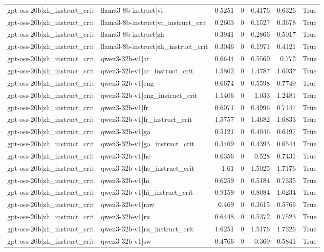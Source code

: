 \begin{table}
\begin{tabular}{l l r r r r l}
gpt-oss-20b|zh_instruct_crit & llama3-8b-instruct|vi & 0.5251 & 0 & 0.4176 & 0.6326 & True \\
gpt-oss-20b|zh_instruct_crit & llama3-8b-instruct|vi_instruct_crit & 0.2603 & 0 & 0.1527 & 0.3678 & True \\
gpt-oss-20b|zh_instruct_crit & llama3-8b-instruct|zh & 0.3941 & 0 & 0.2866 & 0.5017 & True \\
gpt-oss-20b|zh_instruct_crit & llama3-8b-instruct|zh_instruct_crit & 0.3046 & 0 & 0.1971 & 0.4121 & True \\
gpt-oss-20b|zh_instruct_crit & qwen3-32b-v1|ar & 0.6644 & 0 & 0.5569 & 0.772 & True \\
gpt-oss-20b|zh_instruct_crit & qwen3-32b-v1|ar_instruct_crit & 1.5862 & 0 & 1.4787 & 1.6937 & True \\
gpt-oss-20b|zh_instruct_crit & qwen3-32b-v1|eng & 0.6674 & 0 & 0.5598 & 0.7749 & True \\
gpt-oss-20b|zh_instruct_crit & qwen3-32b-v1|eng_instruct_crit & 1.1406 & 0 & 1.033 & 1.2481 & True \\
gpt-oss-20b|zh_instruct_crit & qwen3-32b-v1|fr & 0.6071 & 0 & 0.4996 & 0.7147 & True \\
gpt-oss-20b|zh_instruct_crit & qwen3-32b-v1|fr_instruct_crit & 1.5757 & 0 & 1.4682 & 1.6833 & True \\
gpt-oss-20b|zh_instruct_crit & qwen3-32b-v1|ga & 0.5121 & 0 & 0.4046 & 0.6197 & True \\
gpt-oss-20b|zh_instruct_crit & qwen3-32b-v1|ga_instruct_crit & 0.5469 & 0 & 0.4393 & 0.6544 & True \\
gpt-oss-20b|zh_instruct_crit & qwen3-32b-v1|he & 0.6356 & 0 & 0.528 & 0.7431 & True \\
gpt-oss-20b|zh_instruct_crit & qwen3-32b-v1|he_instruct_crit & 1.61 & 0 & 1.5025 & 1.7176 & True \\
gpt-oss-20b|zh_instruct_crit & qwen3-32b-v1|hi & 0.6259 & 0 & 0.5184 & 0.7335 & True \\
gpt-oss-20b|zh_instruct_crit & qwen3-32b-v1|hi_instruct_crit & 0.9159 & 0 & 0.8084 & 1.0234 & True \\
gpt-oss-20b|zh_instruct_crit & qwen3-32b-v1|raw & 0.469 & 0 & 0.3615 & 0.5766 & True \\
gpt-oss-20b|zh_instruct_crit & qwen3-32b-v1|ru & 0.6448 & 0 & 0.5372 & 0.7523 & True \\
gpt-oss-20b|zh_instruct_crit & qwen3-32b-v1|ru_instruct_crit & 1.6251 & 0 & 1.5176 & 1.7326 & True \\
gpt-oss-20b|zh_instruct_crit & qwen3-32b-v1|sw & 0.4766 & 0 & 0.369 & 0.5841 & True \\

\end{tabular}
\end{table}
